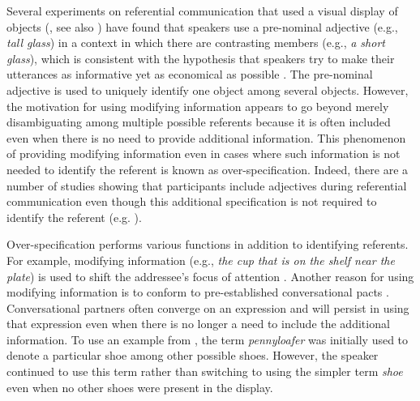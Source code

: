 \documentclass[output=paper]{langsci/langscibook}
\begin{document}
Several experiments on referential communication that used a visual
display of objects (\citealt{tanenhaus1995integration}, see also
\citealt{frank2012predicting}) have found that speakers use a
pre-nominal adjective (e.g., \textit{tall glass}) in a context in which there
are contrasting members (e.g., \textit{a short glass}), which is consistent
with the hypothesis that speakers try to make their utterances as
informative yet as economical as possible \citep{grice1975logic}. The
pre-nominal adjective is used to uniquely identify one object among
several objects. However, the motivation for using modifying
information appears to go beyond merely disambiguating among multiple
possible referents because it is often included even when there is no
need to provide additional information. This phenomenon of providing
modifying information even in cases where such information is not
needed to identify the referent is known as
over-specification. Indeed, there are a number of studies showing that
participants include adjectives during referential communication even
though this additional specification is not required to identify the
referent
(e.g. \citealt{pechmann1989incremental,sedivy2003pragmatic,maes2004reference,koolen2013effect}).

Over-specification performs various functions in addition to
identifying referents. For example, modifying information (e.g., \textit{the
cup that is on the shelf near the plate}) is used to shift the
addressee’s focus of attention \citep{mira1990accessing,prince1992zpg,gundel1993cognitive,chafe1994discourse}. Another reason for using
modifying information is to conform to pre-established conversational
pacts \citep{brennan1996conceptual,ibarra2016flexibility}. Conversational partners often converge on an expression and
will persist in using that expression even when there is no longer a
need to include the additional information. To use an example from
\citet{brennan1996conceptual}, the term \textit{pennyloafer} was initially
used to denote a particular shoe among other possible shoes. However,
the speaker continued to use this term rather than switching to using
the simpler term \textit{shoe} even when no other shoes were present
in the display.
\end{document}
